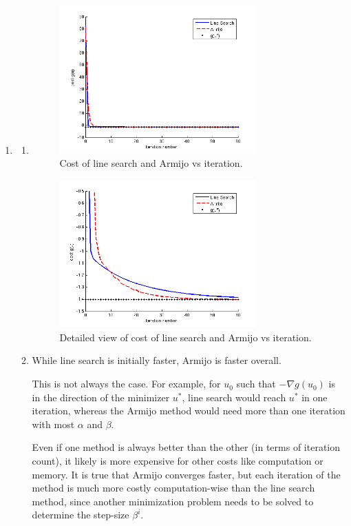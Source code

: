 \documentclass[letterpaper,12pt,titlepage]{article}
\begin{document}
\begin{enumerate}[leftmargin=0pt]
  \clearpage
\item \begin{enumerate}
  \item \mbox{}

      \begin{figure}[h!]
        \includegraphics[width=0.76\textwidth]{hw1p6a}
        \caption{Cost of line search and Armijo vs iteration.}
      \end{figure}
      \begin{figure}[h!]
        \includegraphics[width=0.76\textwidth]{hw1p6a_detail}
        \caption{Detailed view of cost of line search and Armijo vs iteration.}
      \end{figure}
    
    \clearpage
    

  \item While line search is initially faster, Armijo is faster overall.

    This is not always the case. For example, for $u_0$ such that $-\nabla g(u_0)$ is in the direction of the minimizer $u^*$, line search would reach $u^*$ in one iteration, whereas the Armijo method would need more than one iteration with most $\alpha$ and $\beta$.

    Even if one method is always better than the other (in terms of iteration count), it likely is more expensive for other costs like computation or memory. It is true that Armijo converges faster, but each iteration of the method is much more costly computation-wise than the line search method, since another minimization problem needs to be solved to determine the step-size $\beta^i$.
    
  \end{enumerate}
  
\end{enumerate}
\end{document}
